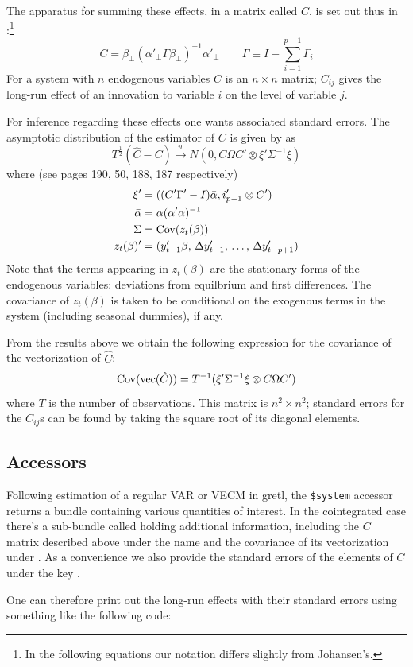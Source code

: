 The apparatus for summing these effects, in a matrix called $C$, is set
out thus in \citet[p.\ 49]{johansen95}:\footnote{In the following equations
our notation differs slightly from Johansen's.}
\[
  C = \beta_{\perp}(\alpha'_{\perp} \Gamma \beta_{\perp})^{-1}
  \alpha'_{\perp} \qquad \Gamma \equiv I - \sum_{i=1}^{p-1}\Gamma_i
\]
For a system with $n$ endogenous variables $C$ is an $n \times n$
matrix; $C_{ij}$ gives the long-run effect of an innovation to variable
$i$ on the level of variable $j$.

For inference regarding these effects one wants associated standard
errors. The asymptotic distribution of the estimator of $C$ is given by
\citet[p.\ 190]{johansen95} as
\[
  T^{\frac12}(\hat{C} - C) \overset{w}{\rightarrow} N(0,
  C\Omega C' \otimes \xi'\Sigma^{-1}\xi)
\]
where (see pages 190, 50, 188, 187 respectively)
\begin{align*}
  \xi' &= ((C'\Gamma' - I)\bar{\alpha}, i'_{p-1}\otimes C') \\
  \bar{\alpha} &= \alpha(\alpha'\alpha)^{-1} \\
  \Sigma &= {\rm Cov}(z_t(\beta)) \\
  z_t(\beta)' &= (y'_{t-1}\beta,\, \Delta y'_{t-1},\, \ldots,\,\Delta y'_{t-p+1})
\end{align*}
Note that the terms appearing in $z_t(\beta)$ are the stationary forms
of the endogenous variables: deviations from equilbrium and first
differences. The covariance of $z_t(\beta)$ is taken to be conditional
on the exogenous terms in the system (including seasonal dummies), if
any.

From the results above we obtain the following expression for the
covariance of the vectorization of $\hat{C}$:
\[
{\rm Cov}({\rm vec}(\hat{C})) = T^{-1}(\xi'\Sigma^{-1}\xi \otimes C\Omega C')
\]
where $T$ is the number of observations. This matrix is $n^2 \times
n^2$; standard errors for the $C_{ij}$s can be found by taking the
square root of its diagonal elements.

\subsection{Accessors}

Following estimation of a regular VAR or VECM in gretl, the
\verb|$system| accessor returns a bundle containing various quantities
of interest. In the cointegrated case there's a sub-bundle called
 holding additional information, including the
$C$ matrix described above under the name  and the
covariance of its vectorization under . As a
convenience we also provide the standard errors of the elements of
$C$ under the key .

One can therefore print out the long-run effects with their standard
errors using something like the following code:

